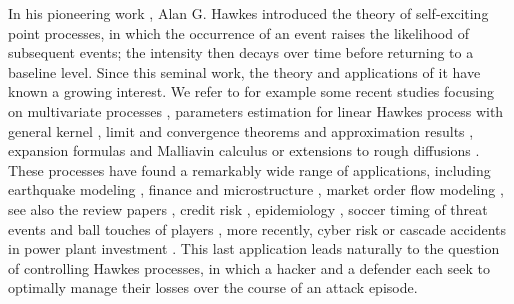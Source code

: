 \documentclass[11pt]{article}
\theoremstyle{remarkitalic}
\theoremstyle{remarkitalic}
\newcommand{\1}{\mathbf 1}
\begin{document}
In his pioneering work \cite{hawkes1971spectra}, Alan G. Hawkes introduced the theory of self-exciting point processes, in which the occurrence of an event raises the likelihood of subsequent events; the intensity then decays over time before returning to a baseline level. Since this seminal work, the theory and applications of it have known a growing interest. We refer to for example some recent studies focusing on multivariate processes  \cite{Bielecki2022, Bielecki2022a}, parameters estimation for linear Hawkes process with general kernel \cite{cartea2021gradient}, limit and convergence theorems and approximation results \cite{jaisson2015limit,khabou2024normal,coutin2025quantification,pace2024convergence}, expansion formulas and Malliavin calculus \cite{hillairet2025explicit,hillairet2025multivariate} or extensions to rough diffusions \cite{jaisson2016rough,el2019characteristic,bondi2024rough}. These processes have found a remarkably wide range of applications, including earthquake modeling \cite{van2010connecting,kwon2023flexible}, finance and microstructure \cite{embrechts2011multivariate,horst2022microstructure}, market order flow modeling \cite{jusselin2020no,jusselin2021optimal,graf2026learning,gennaro2026signature}, see also the review papers \cite{bacry2015hawkes,hawkes2018hawkes}, credit risk \cite{errais2010affine}, epidemiology \cite{rizoiu2018sir}, soccer timing of threat events and ball touches of players \cite{baouan2025crediting}, more recently, cyber risk \cite{baldwin2017contagion,dubois2022cyber,bessy2021multivariate, callegaro2025stochastic,hillairet2023expansion} or cascade accidents in power plant investment \cite{agostino2026approximation}. This last application leads naturally to the question of controlling Hawkes processes, in which a hacker and a defender each seek to optimally manage their losses over the course of an attack episode.\vspace{0.3em}
\end{document}
